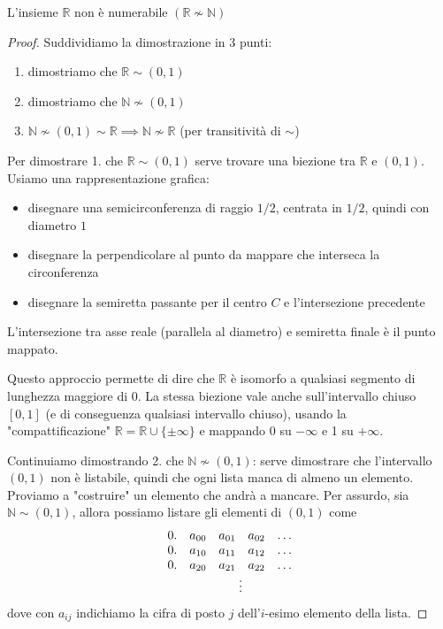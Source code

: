 \begin{theor}
	L'insieme $\mathbb{R}$ non è numerabile $(\mathbb{R} \nsim \mathbb{N})$
\end{theor}
\begin{proof}
	Suddividiamo la dimostrazione in 3 punti: 
	\begin{enumerate}
		\item dimostriamo che $\mathbb{R} \sim (0,1)$
		\item dimostriamo che $\mathbb{N} \nsim (0,1)$
		\item $\mathbb{N} \nsim (0,1) \sim \mathbb{R} \implies \mathbb{N} \nsim \mathbb{R}$ (per transitività di $\sim$)
	\end{enumerate}
	
	Per dimostrare 1. che $\mathbb{R} \sim (0,1)$ serve trovare una biezione tra $\mathbb{R}$ e $(0,1)$. Usiamo una rappresentazione grafica:
	\begin{itemize}
		\item disegnare una semicirconferenza di raggio $1/2$, centrata in $1/2$, quindi con diametro $1$
		\item disegnare la perpendicolare al punto da mappare che interseca la circonferenza
		\item disegnare la semiretta passante per il centro $C$ e l'intersezione precedente
	\end{itemize}
	L'intersezione tra asse reale (parallela al diametro) e semiretta finale è il punto mappato. 
	
	\begin{center}
		
	  \end{center}

	\vspace{-2.5cm}
	
	Questo approccio permette di dire che $\mathbb{R}$ è isomorfo a qualsiasi segmento di lunghezza maggiore di $0$. La stessa biezione vale anche sull'intervallo chiuso $[0,1]$ (e di conseguenza qualsiasi intervallo chiuso), usando la "compattificazione" $\mathbb{R} = \mathbb{R} \cup \{\pm \infty\}$ e mappando $0$ su $-\infty$ e 1 su $+ \infty$.
	
	Continuiamo dimostrando 2. che $\mathbb{N} \nsim (0,1)$: serve dimostrare che l'intervallo $(0,1)$ non è listabile, quindi che ogni lista manca di almeno un elemento. Proviamo a "costruire" un elemento che andrà a mancare. Per assurdo, sia $\mathbb{N} \sim (0,1)$, allora possiamo listare gli elementi di $(0,1)$ come
	$$ 
	\begin{array}{c c c c c}
		0. & a_{00} & a_{01} & a_{02} & \dots \\
		0. & a_{10} & a_{11} & a_{12} & \dots \\
		0. & a_{20} & a_{21} & a_{22} & \dots \\
		 & \multicolumn{4}{c}{\vdots}
	\end{array}
	$$
	dove con $a_{ij}$ indichiamo la cifra di posto $j$ dell'$i$-esimo elemento della lista.
	

\end{proof}
